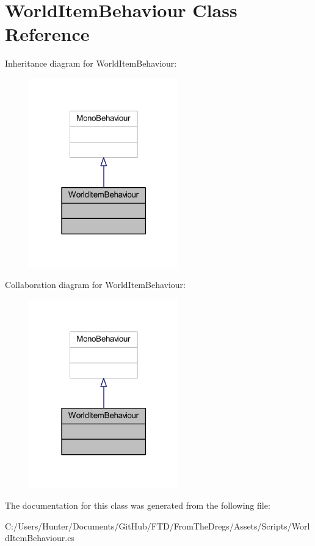 \hypertarget{class_world_item_behaviour}{}\section{World\+Item\+Behaviour Class Reference}
\label{class_world_item_behaviour}


Inheritance diagram for World\+Item\+Behaviour\+:
\nopagebreak
\begin{figure}[H]
\begin{center}
\leavevmode
\includegraphics[width=183pt]{class_world_item_behaviour__inherit__graph}
\end{center}
\end{figure}


Collaboration diagram for World\+Item\+Behaviour\+:
\nopagebreak
\begin{figure}[H]
\begin{center}
\leavevmode
\includegraphics[width=183pt]{class_world_item_behaviour__coll__graph}
\end{center}
\end{figure}


The documentation for this class was generated from the following file\+:\begin{DoxyCompactItemize}
\item 
C\+:/\+Users/\+Hunter/\+Documents/\+Git\+Hub/\+F\+T\+D/\+From\+The\+Dregs/\+Assets/\+Scripts/World\+Item\+Behaviour.\+cs\end{DoxyCompactItemize}
